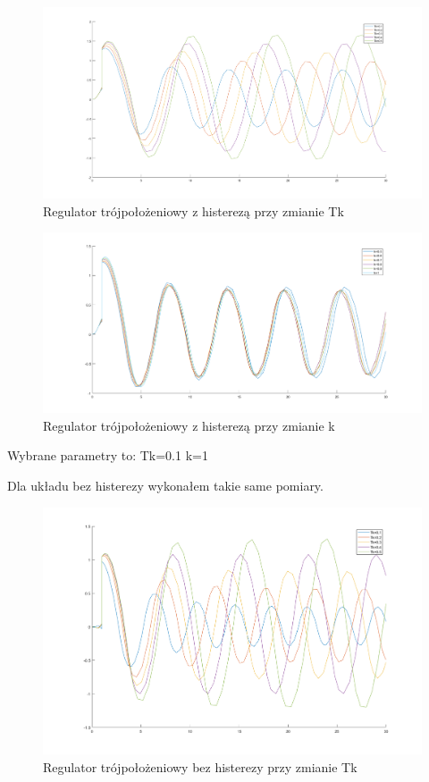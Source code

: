 \documentclass[a4paper,10pt]{article}
\begin{document}
\begin{enumerate}
\newpage
		
\begin{figure}[!h]
    \centering
	\includegraphics[width=120mm]{troj_kor_tk.png}
	\caption{Regulator trójpołożeniowy z histerezą przy zmianie Tk}
    \label{fig:Rysunek}
\end{figure}

\begin{figure}[!h]
    \centering
	\includegraphics[width=120mm]{troj_kor_k.png}
	\caption{Regulator trójpołożeniowy z histerezą przy zmianie k}
    \label{fig:Rysunek}
\end{figure}

Wybrane parametry to:
Tk=0.1
k=1

\newpage
\newpage
Dla układu bez histerezy wykonałem takie same pomiary.
\begin{figure}[!h]
    \centering
	\includegraphics[width=120mm]{troj_kor_tk_bez.png}
	\caption{Regulator trójpołożeniowy bez histerezy przy zmianie Tk}
    \label{fig:Rysunek}
\end{figure}


\end{enumerate}
\end{document}
